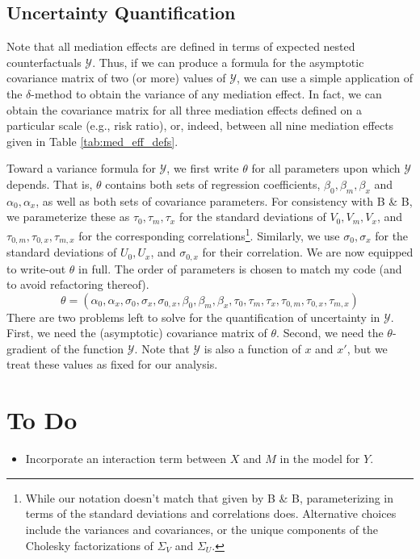 \documentclass{article}
\newcommand{\sY}{\mathcal{Y}}
\begin{document}
\subsection{Uncertainty Quantification}

Note that all mediation effects are defined in terms of expected nested counterfactuals $\sY$. Thus, if we can produce a formula for the asymptotic covariance matrix of two (or more) values of $\sY$, we can use a simple application of the $\delta$-method to obtain the variance of any mediation effect. In fact, we can obtain the covariance matrix for all three mediation effects defined on a particular scale (e.g., risk ratio), or, indeed, between all nine mediation effects given in Table \ref{tab:med_eff_defs}. 

Toward a variance formula for $\sY$, we first write $\theta$ for all parameters upon which $\sY$ depends. That is, $\theta$ contains both sets of regression coefficients, $\beta_0, \beta_m, \beta_x$ and $\alpha_0, \alpha_x$, as well as both sets of covariance parameters. For consistency with B \& B, we parameterize these as $\tau_0, \tau_m, \tau_x$ for the standard deviations of $V_0, V_m, V_x$, and $\tau_{0,m}, \tau_{0,x}, \tau_{m,x}$ for the corresponding correlations\footnote{While our notation doesn't match that given by B \& B, parameterizing in terms of the standard deviations and correlations does. Alternative choices include the variances and covariances, or the unique components of the Cholesky factorizations of $\Sigma_V$ and $\Sigma_U$.}. Similarly, we use $\sigma_0, \sigma_x$ for the standard deviations of $U_0, U_x$, and $\sigma_{0,x}$ for their correlation. We are now equipped to write-out $\theta$ in full. The order of parameters is chosen to match my code (and to avoid refactoring thereof).
$$
\theta = (\alpha_0, \alpha_x, \sigma_0, \sigma_x, \sigma_{0,x}, \beta_0, \beta_m, \beta_x, \tau_0, \tau_m, \tau_x, \tau_{0,m}, \tau_{0,x}, \tau_{m,x})
$$
%
There are two problems left to solve for the quantification of uncertainty in $\sY$. First, we need the (asymptotic) covariance matrix of $\theta$. Second, we need the $\theta$-gradient of the function $\sY$. Note that $\sY$ is also a function of $x$ and $x'$, but we treat these values as fixed for our analysis.

\section{To Do}
\begin{itemize}
    \item Incorporate an interaction term between $X$ and $M$ in the model for $Y$.
\end{itemize}


% 
% 
\end{document}
